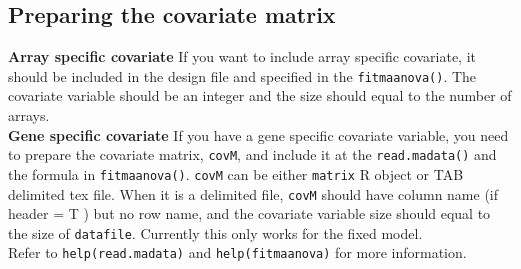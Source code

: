 \subsection{Preparing the covariate matrix}
{\bf Array specific covariate} If you want to include array specific
covariate, it should be included in the design file and specified in the {\tt fitmaanova()}. The covariate variable
should be an integer and the size should equal to the number of arrays. \\
{\bf Gene specific covariate} If you have a gene specific covariate variable,
you need to prepare the
covariate matrix, {\tt covM}, and include it at the {\tt read.madata()} and the
formula in {\tt fitmaanova()}. {\tt covM} can be either {\tt matrix} R object or
TAB delimited tex file. When it is a delimited file, {\tt covM} should have
column name (if header = T ) but no row name, and the covariate variable size should equal to
the size of {\tt datafile}. Currently this only works for the fixed model. \\
Refer to {\tt help(read.madata)} and {\tt help(fitmaanova)} for more
information. 